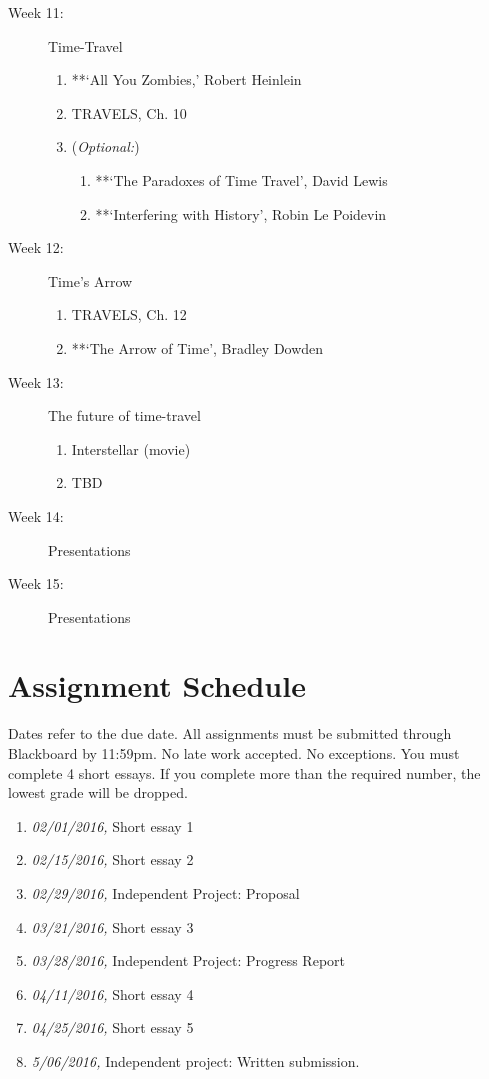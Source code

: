 \documentclass[article,oneside]{memoir}
\begin{document}
\begin{description}
\begin{enumerate}
\end{enumerate}

\item[Week 11:]  Time-Travel
\begin{enumerate}
\item **`All You Zombies,'  Robert Heinlein
\item TRAVELS, Ch. 10 
\item (\emph{Optional:})
\begin{enumerate}
\item **`The Paradoxes of Time Travel', David Lewis
\item **`Interfering with History', Robin Le Poidevin 
\end{enumerate}
\end{enumerate}

\item[Week 12:] Time's Arrow
\begin{enumerate}
\item TRAVELS, Ch. 12
\item **`The Arrow of Time', Bradley Dowden
\end{enumerate}


\item[Week 13:]  The future of time-travel
\begin{enumerate}
\item Interstellar (movie)
\item TBD
\end{enumerate}



\item[Week 14:] Presentations




\item[Week 15:] Presentations
 \end{description}

\section{ Assignment Schedule}
Dates refer to the due date. All assignments must be submitted through Blackboard by 11:59pm. No late work accepted. No exceptions. You must complete 4 short essays. If you complete more than the required number, the lowest grade will be dropped.
\begin{enumerate}
\item \textit{02/01/2016,} Short essay 1
\item \textit{02/15/2016,} Short essay 2
\item \textit{02/29/2016,} Independent Project: Proposal
\item \textit{03/21/2016,} Short essay 3
\item \textit{03/28/2016,} Independent Project: Progress Report
\item \textit{04/11/2016,} Short essay 4
\item \textit{04/25/2016,} Short essay 5
\item \textit{5/06/2016,} Independent project: Written submission.
\end{enumerate}




\end{document}
